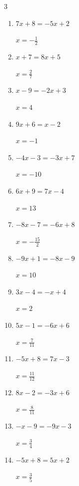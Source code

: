 \begin{multicols}{3}
\begin{enumerate}
        $\displaystyle x=\frac{4}{3}$

  \item $7x+8=-5x+2$

        $\displaystyle x=-\frac{1}{2}$

  \item $x+7=8x+5$

        $\displaystyle x=\frac{2}{7}$

  \item $x-9=-2x+3$

        $\displaystyle x=4$

  \item $9x+6=x-2$

        $\displaystyle x=-1$

  \item $-4x-3=-3x+7$

        $\displaystyle x=-10$

  \item $6x+9=7x-4$

        $\displaystyle x=13$

  \item $-8x-7=-6x+8$

        $\displaystyle x=-\frac{15}{2}$

  \item $-9x+1=-8x-9$

        $\displaystyle x=10$

  \item $3x-4=-x+4$

        $\displaystyle x=2$

  \item $5x-1=-6x+6$

        $\displaystyle x=\frac{7}{11}$

\columnbreak %

  \item $-5x+8=7x-3$

        $\displaystyle x=\frac{11}{12}$

  \item $8x-2=-3x+6$

        $\displaystyle x=\frac{8}{11}$

  \item $-x-9=-9x-3$

        $\displaystyle x=\frac{3}{4}$

  \item $-5x+8=5x+2$

        $\displaystyle x=\frac{3}{5}$


\end{enumerate}
\end{multicols}
